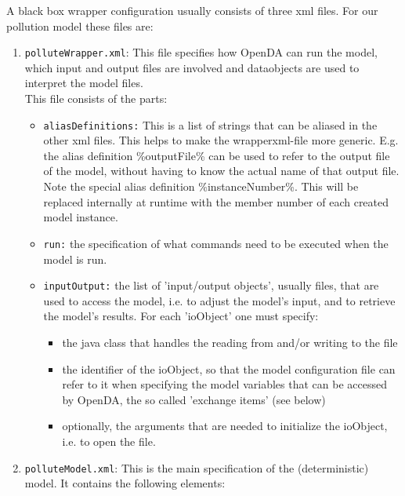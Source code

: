 A black box wrapper configuration usually consists of three xml files. For our
pollution model these files are:
\begin{enumerate}
   \item {\tt polluteWrapper.xml}: This file specifies how OpenDA can run the model, which input and output files are involved and dataobjects are used to interpret the model files.
     \\ This file
     consists of the parts:
     \begin{itemize}
        \item {\tt aliasDefinitions:} This is a list of strings that can be
          aliased in the other xml files. This helps to make the
          wrapperxml-file more generic. E.g. the alias definition
          \%outputFile\% can be used to refer to the output file of the model,
          without having to know the actual name of that output file.\\ Note
          the special alias definition \%instanceNumber\%. This will be
          replaced internally at runtime with the member number of each created
          model instance.
        \item {\tt run:} the specification of what commands need to be executed
          when the model is run.
        \item {\tt inputOutput:} the list of 'input/output objects', usually
          files, that are used to access the model, i.e. to adjust the model's
          input, and to retrieve the model's results. For each 'ioObject' one
          must specify:
        \begin{itemize}
           \item the java class that handles the reading from and/or writing to
             the file
           \item the identifier of the ioObject, so that the model
             configuration file can refer to it when specifying the model
             variables that can be accessed by OpenDA, the so called 'exchange
             items' (see below)
           \item optionally, the arguments that are needed to initialize the
             ioObject, i.e. to open the file.
        \end{itemize}
     \end{itemize}
   \item {\tt polluteModel.xml}: This is the main specification of the
     (deterministic) model. It contains the following elements:
     \begin{itemize}

\end{itemize}
\end{enumerate}
